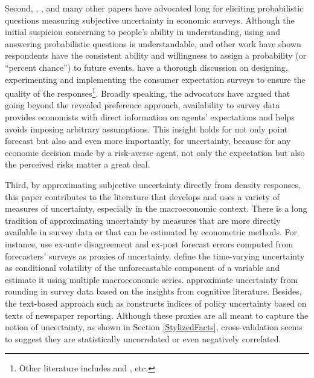 \documentclass[12pt]{article}
\begin{document}
	
	Second, \citet{manski2004measuring}, \citet{delavande2011measuring}, \citet{manski2018survey} and many other papers have advocated long for eliciting probabilistic questions measuring subjective uncertainty in economic surveys. Although the initial suspicion concerning to people's ability in understanding, using and answering probabilistic questions is understandable, \citet{bertrand2001people} and other work have shown respondents have the consistent ability and willingness to assign a probability (or “percent chance”) to future events. \citet{armantier2017overview} have a thorough discussion on designing, experimenting and implementing the consumer expectation surveys to ensure the quality of the responses\footnote{Other literature includes \citet{van2008rethinking} and \citet{delavande2014probabilistic}, etc.}. Broadly speaking, the advocators have argued that going beyond the revealed preference approach, availability to survey data provides economists with direct information on agents' expectations and helps avoids imposing arbitrary assumptions.  This insight holds for not only point forecast but also and even more importantly, for uncertainty, because for any economic decision made by a risk-averse agent, not only the expectation but also the perceived risks matter a great deal. 
	 
	Third, by approximating subjective uncertainty directly from density responses, this paper contributes to the literature that develops and uses a variety of measures of uncertainty, especially in the macroeconomic context. There is a long tradition of approximating uncertainty by measures that are more directly available in survey data or that can be estimated by econometric methods. For instance, \citet{bachmann2013uncertainty} use ex-ante disagreement and ex-post forecast errors computed from forecasters' surveys as proxies of uncertainty. \citet{jurado2015measuring} define the time-varying uncertainty as conditional volatility of the unforecastable component of a variable and estimate it using multiple macroeconomic series. \citet{binder2017measuring} approximate uncertainty from rounding in survey data based on the insights from cognitive literature. Besides, the text-based approach such as \citet{bloom2009impact} constructs indices of policy uncertainty based on texts of newspaper reporting. Although these proxies are all meant to capture the notion of uncertainty,  as shown in Section \ref{StylizedFacts}, cross-validation seems to suggest they are statistically uncorrelated or even negatively correlated.  
	 	
\end{document}
